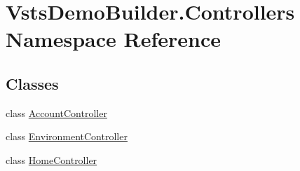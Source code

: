\hypertarget{namespace_vsts_demo_builder_1_1_controllers}{}\section{Vsts\+Demo\+Builder.\+Controllers Namespace Reference}
\label{namespace_vsts_demo_builder_1_1_controllers}
\subsection*{Classes}
\begin{DoxyCompactItemize}
\item 
class \mbox{\hyperlink{class_vsts_demo_builder_1_1_controllers_1_1_account_controller}{Account\+Controller}}
\item 
class \mbox{\hyperlink{class_vsts_demo_builder_1_1_controllers_1_1_environment_controller}{Environment\+Controller}}
\item 
class \mbox{\hyperlink{class_vsts_demo_builder_1_1_controllers_1_1_home_controller}{Home\+Controller}}
\end{DoxyCompactItemize}
